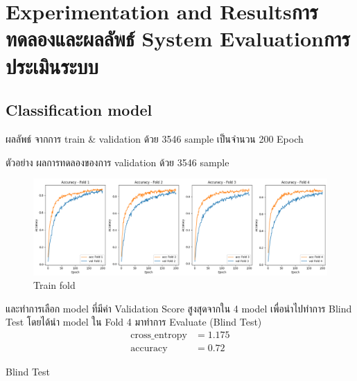 \chapter{\ifproject%
      \ifenglish Experimentation and Results\else การทดลองและผลลัพธ์\fi
  \else%
      \ifenglish System Evaluation\else การประเมินระบบ\fi
  \fi}


\section{Classification model}
\par ผลลัพธ์ จากการ train \& validation ด้วย 3546 sample เป็นจำนวน 200 Epoch

ตัวอย่าง ผลการทดลองของการ validation ด้วย 3546 sample
\begin{figure}[h]
    \begin{center}

        \includegraphics[scale=0.4]{pic/model/train_fold.png}
    \end{center}

    \caption[Train fold]{Train fold}
    \label{fig:Train fold}
\end{figure}


และทำการเลือก model ที่มีค่า Validation Score สูงสุดจากใน 4 model
เพื่อนำไปทำการ Blind Test
โดยได้นำ model ใน  Fold 4   มาทำการ
Evaluate (Blind Test)
\begin{align}
    \text{cross\_entropy} & = 1.175 \\
    \text{accuracy}       & = 0.72
\end{align}

Blind Test

